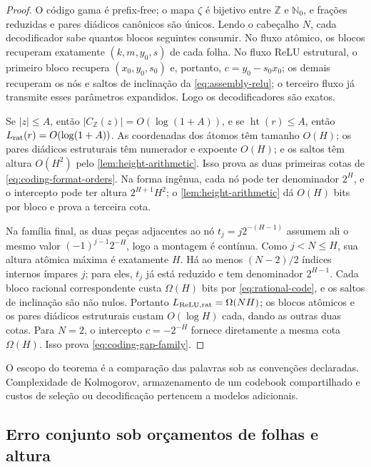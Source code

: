 \documentclass[11pt,a4paper]{article}
\theoremstyle{definition}
\theoremstyle{remark}
\newcommand{\Nzero}{\mathbb{N}_0}
\newcommand{\height}{\operatorname{ht}}
\begin{document}
\begin{proof}
O código gama é prefix-free; o mapa $\zeta$ é bijetivo entre $\mathbb Z$ e
$\Nzero$, e frações reduzidas e pares diádicos canônicos são únicos. Lendo o
cabeçalho $N$, cada decodificador sabe quantos blocos seguintes consumir. No
fluxo atômico, os blocos recuperam exatamente $(k,m,y_0,s)$ de cada folha. No
fluxo ReLU estrutural, o primeiro bloco recupera $(x_0,y_0,s_0)$ e, portanto,
$c=y_0-s_0x_0$; os demais recuperam os nós e saltos de inclinação da
\cref{eq:assembly-relu}; o terceiro fluxo já transmite esses parâmetros
expandidos. Logo os decodificadores são exatos.

Se $|z|\le A$, então $|C_{\mathbb Z}(z)|=O(\log(1+A))$, e se
$\height(r)\le A$, então $L_{\rm rat}(r)=O(\log(1+A))$. As coordenadas dos
átomos têm tamanho $O(H)$; os pares diádicos estruturais têm numerador e
expoente $O(H)$; e os saltos têm altura $O(H^2)$ pelo
\cref{lem:height-arithmetic}. Isso prova as duas primeiras cotas de
\eqref{eq:coding-format-orders}. Na forma ingênua, cada nó pode ter
denominador $2^H$, e o intercepto pode ter altura $2^{H+1}H^2$; o
\cref{lem:height-arithmetic} dá $O(H)$ bits por bloco e prova a terceira cota.

Na família final, as duas peças adjacentes ao nó
$t_j=j2^{-(H-1)}$ assumem ali o mesmo valor
$(-1)^{j-1}2^{-H}$, logo a montagem é contínua. Como $j<N\le H$, sua altura
atômica máxima é exatamente $H$. Há ao menos $(N-2)/2$ índices internos
ímpares $j$; para eles, $t_j$ já está reduzido e tem denominador
$2^{H-1}$. Cada bloco racional correspondente custa $\Omega(H)$ bits por
\eqref{eq:rational-code}, e os saltos de inclinação são não nulos. Portanto
$L_{\rm ReLU,rat}=\Omega(NH)$; os blocos atômicos e os pares diádicos
estruturais custam $O(\log H)$ cada, dando as outras duas cotas. Para $N=2$,
o intercepto $c=-2^{-H}$ fornece diretamente a mesma cota $\Omega(H)$.
Isso prova \eqref{eq:coding-gap-family}.
\end{proof}

O escopo do teorema é a comparação das palavras sob as convenções declaradas.
Complexidade de Kolmogorov, armazenamento de um codebook compartilhado e
custos de seleção ou decodificação pertencem a modelos adicionais.

\subsection{Erro conjunto sob orçamentos de folhas e altura}
\label{subsec:joint-budget}
\end{document}
